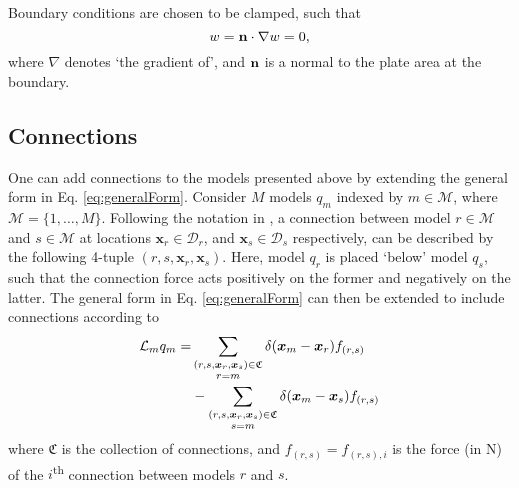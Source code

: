 \documentclass{article}
\begin{document}
Boundary conditions are chosen to be clamped, such that
\begin{equation}
        w = {\bf n} \cdot \nabla w = 0,
\end{equation}
where $\nabla$ denotes `the gradient of', and ${\bf n}$ is a normal to the plate area at the boundary.

\subsection{Connections}
One can add connections to the models presented above by extending the general form in Eq. \eqref{eq:generalForm}. Consider $M$ models $q_m$ indexed by $m \in \mathcal{M}$, where $\mathcal{M} = \{1, \hdots, M\}$. Following the notation in \cite{Sudholt2021}, a connection between model $r \in \mathcal{M}$ and $s\in \mathcal{M}$ at locations $\boldsymbol{x}_r \in \mathcal{D}_r$, and $\boldsymbol{x}_s \in \mathcal{D}_s$ respectively, can be described by the following 4-tuple $(r, s, \boldsymbol{x}_r, \boldsymbol{x}_s)$. Here, model $q_r$ is placed `below' model $q_s$, such that the connection force acts positively on the former and negatively on the latter.  The general form in Eq. \eqref{eq:generalForm} can then be extended to include connections according to
\begin{equation}\label{eq:generalFormConnections}
    \begin{aligned}
        \mathcal{L}_mq_m = &\sum_{\substack{(r, s, \boldsymbol{x}_r, \boldsymbol{x}_s) \in \mathfrak{C} \vspace{0.2em}\\
        r=m}} \delta(\boldsymbol{x}_m - \boldsymbol{x}_r) f_{(r,s)}\\
        &- \sum_{\substack{(r, s, \boldsymbol{x}_r, \boldsymbol{x}_s) \in \mathfrak{C} \vspace{0.2em} \\
        s=m}} \delta(\boldsymbol{x}_m - \boldsymbol{x}_s) f_{(r,s)}
    \end{aligned}
\end{equation}
where $\mathfrak{C}$ is the collection of connections, and $f_{(r,s)} = f_{(r,s), i}$ is the force (in N) of the $i$\textsuperscript{th} connection between models $r$ and $s$.
\end{document}
